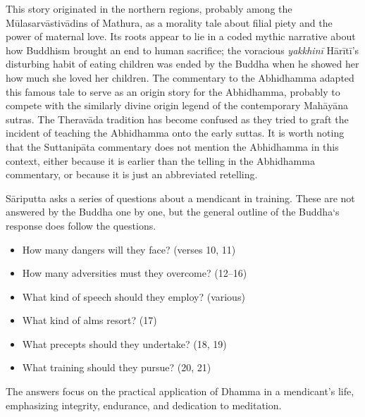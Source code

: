 \documentclass[12pt,openany]{book}%
\begin{document}
This story originated in the northern regions, probably among the \textsanskrit{Mūlasarvāstivādins} of Mathura, as a morality tale about filial piety and the power of maternal love. Its roots appear to lie in a coded mythic narrative about how Buddhism brought an end to human sacrifice; the voracious \textit{\textsanskrit{yakkhinī}} \textsanskrit{Hārītī}’s disturbing habit of eating children was ended by the Buddha when he showed her how much she loved her children. The commentary to the Abhidhamma adapted this famous tale to serve as an origin story for the Abhidhamma, probably to compete with the similarly divine origin legend of the contemporary \textsanskrit{Mahāyāna} sutras. The \textsanskrit{Theravāda} tradition has become confused as they tried to graft the incident of teaching the Abhidhamma onto the early suttas. It is worth noting that the \textsanskrit{Suttanipāta} commentary does not mention the Abhidhamma in this context, either because it is earlier than the telling in the Abhidhamma commentary, or because it is just an abbreviated retelling.

\textsanskrit{Sāriputta} asks a series of questions about a mendicant in training. These are not answered by the Buddha one by one, but the general outline of the Buddha‘s response does follow the questions.

\begin{itemize}%
\item How many dangers will they face? (verses 10, 11)%
\item How many adversities must they overcome? (12–16)%
\item What kind of speech should they employ? (various)%
\item What kind of alms resort? (17)%
\item What precepts should they undertake? (18, 19)%
\item What training should they pursue? (20, 21)%
\end{itemize}

The answers focus on the practical application of Dhamma in a mendicant’s life, emphasizing integrity, endurance, and dedication to meditation.
\end{document}
